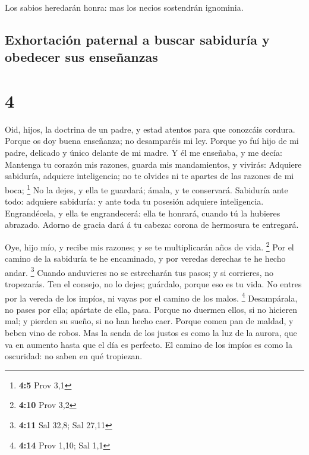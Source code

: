  Los sabios heredarán honra: mas los necios sostendrán
ignominia.

\hypertarget{exhortaciuxf3n-paternal-a-buscar-sabiduruxeda-y-obedecer-sus-enseuxf1anzas}{%
\subsection{Exhortación paternal a buscar sabiduría y obedecer sus
enseñanzas}\label{exhortaciuxf3n-paternal-a-buscar-sabiduruxeda-y-obedecer-sus-enseuxf1anzas}}

\hypertarget{section-3}{%
\section{4}\label{section-3}}

 Oid, hijos, la doctrina de un padre, y estad atentos para
que conozcáis cordura.  Porque os doy buena enseñanza; no
desamparéis mi ley.  Porque yo fuí hijo de mi padre,
delicado y único delante de mi madre.  Y él me enseñaba, y
me decía: Mantenga tu corazón mis razones, guarda mis mandamientos, y
vivirás:  Adquiere sabiduría, adquiere inteligencia; no te
olvides ni te apartes de las razones de mi boca; \footnote{\textbf{4:5}
  Prov 3,1}  No la dejes, y ella te guardará; ámala, y te
conservará.  Sabiduría ante todo: adquiere sabiduría: y ante
toda tu posesión adquiere inteligencia.  Engrandécela, y
ella te engrandecerá: ella te honrará, cuando tú la hubieres abrazado.
 Adorno de gracia dará á tu cabeza: corona de hermosura te
entregará.

 Oye, hijo mío, y recibe mis razones; y se te multiplicarán
años de vida. \footnote{\textbf{4:10} Prov 3,2}  Por el
camino de la sabiduría te he encaminado, y por veredas derechas te he
hecho andar. \footnote{\textbf{4:11} Sal 32,8; Sal 27,11} 
Cuando anduvieres no se estrecharán tus pasos; y si corrieres, no
tropezarás.  Ten el consejo, no lo dejes; guárdalo, porque
eso es tu vida.  No entres por la vereda de los impíos, ni
vayas por el camino de los malos. \footnote{\textbf{4:14} Prov 1,10; Sal
  1,1}  Desampárala, no pases por ella; apártate de ella,
pasa.  Porque no duermen ellos, si no hicieren mal; y
pierden su sueño, si no han hecho caer.  Porque comen pan
de maldad, y beben vino de robos.  Mas la senda de los
justos es como la luz de la aurora, que va en aumento hasta que el día
es perfecto.  El camino de los impíos es como la oscuridad:
no saben en qué tropiezan.

